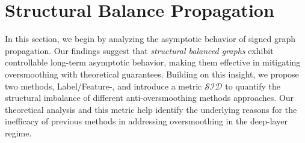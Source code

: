 


\section{Structural Balance Propagation}
\label{sec: our methods}





In this section, we begin by analyzing the asymptotic behavior of signed graph propagation. Our findings suggest that \textit{structural balanced graphs} exhibit controllable long-term asymptotic behavior, making them effective in mitigating oversmoothing with theoretical guarantees. Building on this insight, we propose two methods, Label/Feature-\ours, and introduce a metric $\mathcal{SID}$ to quantify the structural imbalance of different anti-oversmoothing methods approaches. Our theoretical analysis and this metric help identify the underlying reasons for the inefficacy of previous methods in addressing oversmoothing in the deep-layer regime. 

